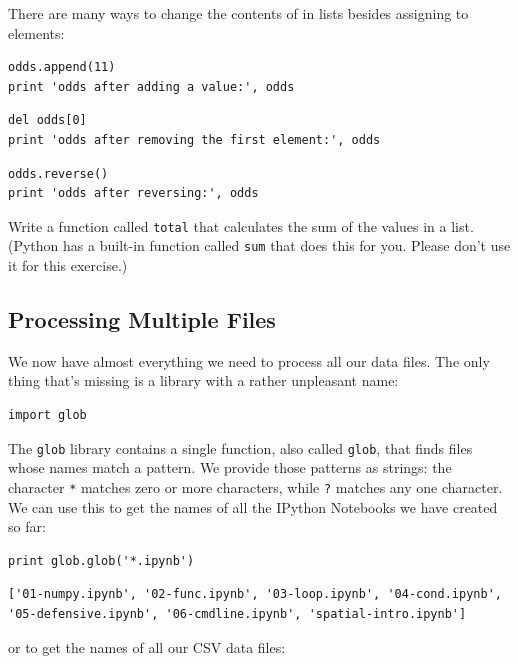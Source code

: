 \documentclass{book}
\begin{document}
There are many ways to change the contents of in lists besides assigning
to elements:

\begin{verbatim}
odds.append(11)
print 'odds after adding a value:', odds
\end{verbatim}

\begin{verbatim}
del odds[0]
print 'odds after removing the first element:', odds
\end{verbatim}

\begin{verbatim}
odds.reverse()
print 'odds after reversing:', odds
\end{verbatim}

\begin{challenge}
  Write a function called \texttt{total} that calculates the sum of the
  values in a list. (Python has a built-in function called \texttt{sum}
  that does this for you. Please don't use it for this exercise.)
\end{challenge}

\subsection{Processing Multiple Files}

We now have almost everything we need to process all our data files. The
only thing that's missing is a library with a rather unpleasant name:

\begin{verbatim}
import glob
\end{verbatim}

The \texttt{glob} library contains a single function, also called
\texttt{glob}, that finds files whose names match a pattern. We provide
those patterns as strings: the character \texttt{*} matches zero or more
characters, while \texttt{?} matches any one character. We can use this
to get the names of all the IPython Notebooks we have created so far:

\begin{verbatim}
print glob.glob('*.ipynb')
\end{verbatim}

\begin{verbatim}
['01-numpy.ipynb', '02-func.ipynb', '03-loop.ipynb', '04-cond.ipynb', '05-defensive.ipynb', '06-cmdline.ipynb', 'spatial-intro.ipynb']
\end{verbatim}

or to get the names of all our CSV data files:
\end{document}
